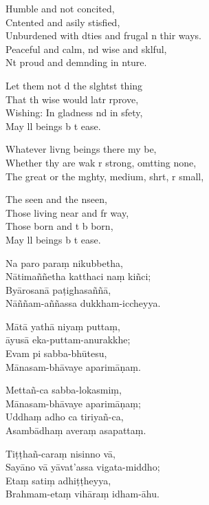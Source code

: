 Humble and not concited,\\
Cntented and asily stisfied,\\
Unburdened with dties and frugal n thir ways.\\
Peaceful and calm, nd wise and sklful,\\
Nt proud and demnding in nture.

Let them not d the slghtst thing\\
That th wise would latr rprove,\\
Wishing: In gladness nd in sfety,\\
May ll beings b t ease.

Whatever livng beings there my be,\\
Whether thy are wak r strong, omtting none,\\
The great or the mghty, medium, shrt, r small,

The seen and the nseen,\\
Those living near and fr way,\\
Those born and t b born,\\
May ll beings b t ease.

\clearpage

Na paro paraṃ nikubbetha,\\%
Nātimaññetha katthaci naṃ kiñci;\\
Byārosanā paṭighasaññā,\\
Nāññam-aññassa dukkham-iccheyya.

Mātā yathā niyaṃ puttaṃ,\\
āyusā eka-puttam-anurakkhe;\\
Evam pi sabba-bhūtesu,\\
Mānasam-bhāvaye aparimāṇaṃ.

Mettañ-ca sabba-lokasmiṃ,\\
Mānasam-bhāvaye aparimāṇaṃ;\\
Uddhaṃ adho ca tiriyañ-ca,\\
Asambādhaṃ averaṃ asapattaṃ.

Tiṭṭhañ-caraṃ nisinno vā,\\
Sayāno vā yāvat'assa vigata-middho;\\
Etaṃ satiṃ adhiṭṭheyya,\\
Brahmam-etaṃ vihāraṃ idham-āhu.

